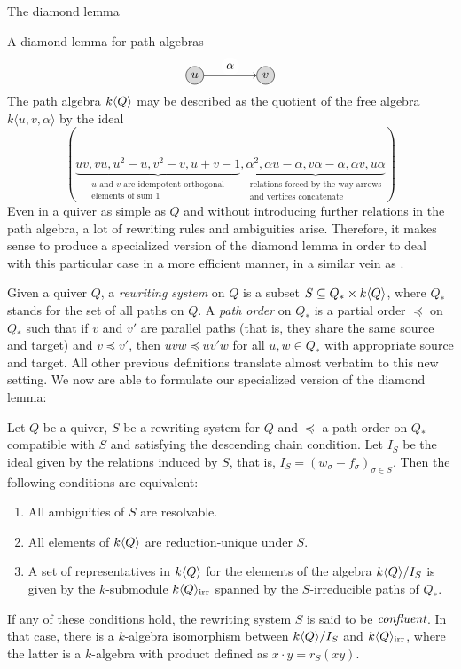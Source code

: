 \begin{chapter}{The diamond lemma}
\begin{section}{A diamond lemma for path algebras}
\[
\begin{tikzpicture}[->,node distance=1cm, thick]
\tikzstyle{every node} = [circle, fill=gray!30, minimum size=.5cm, inner sep=.07cm, draw=black, thin]
\node (1) at (0,0) {$u$};
\node (2) at (2,0) {$v$};
\draw (1) -- (2) node[midway, above, fill=white, draw=none] {$\alpha$};
\end{tikzpicture}
\]
The path algebra $k\langle Q\rangle$ may be described as the quotient of the free algebra $k\langle u,v,\alpha\rangle$ by the ideal
\[(\underbrace{uv, vu, u^2-u, v^2-v, u+v-1}_{\substack{\text{$u$ and $v$ are idempotent orthogonal}\\\text{elements of sum $1$}}}, \underbrace{\alpha^2, \alpha u-\alpha, v\alpha-\alpha, \alpha v,u\alpha }_{\substack{\text{relations forced by the way arrows}\\\text{and vertices concatenate}}})\]
Even in a quiver as simple as $Q$ and without introducing further relations in the path algebra, a lot of rewriting rules and ambiguities arise. Therefore, it makes sense to produce a specialized version of the diamond lemma in order to deal with this particular case in a more efficient manner, in a similar vein as \cite{FFG93}.

Given a quiver $Q$, a \emph{rewriting system} on $Q$ is a subset $S\subseteq Q_*\times k\langle Q\rangle$, where $Q_*$ stands for the set of all paths on $Q$. A \emph{path order} on $Q_*$ is a partial order $\preceq$ on $Q_*$ such that if $v$ and $v'$ are parallel paths (that is, they share the same source and target) and $v\preceq v'$, then $uvw\preceq uv'w$ for all $u,w\in Q_*$ with appropriate source and target. All other previous definitions translate almost verbatim to this new setting. We now are able to formulate our specialized version of the diamond lemma:

\begin{thm}\label{quiver-diamond-lemma} Let $Q$ be a quiver, $S$ be a rewriting system for $Q$ and $\preceq$ a path order on $Q_*$ compatible with $S$ and satisfying the descending chain condition. Let $I_S$ be the ideal given by the relations induced by $S$, that is, $I_S=(w_\sigma-f_\sigma)_{\sigma\in S}$. Then the following conditions are equivalent:
\begin{enumerate}
\item All ambiguities of $S$ are resolvable.
\item All elements of $k\langle Q\rangle$ are reduction-unique under $S$.
\item A set of representatives in $k\langle Q\rangle$ for the elements of the algebra $k\langle Q\rangle/I_S$ is given by the $k$-submodule $k\langle Q\rangle_{\mathrm{irr}}$ spanned by the $S$-irreducible paths of $Q_*$.
\end{enumerate}
If any of these conditions hold, the rewriting system $S$ is said to be $\emph{confluent}$. In that case, there is a $k$-algebra isomorphism between $k\langle Q\rangle/I_S$ and $k\langle Q\rangle_{\mathrm{irr}}$, where the latter is a $k$-algebra with product defined as $x\cdot y= r_S(xy)$.
\end{thm}


\end{section}
\end{chapter}
